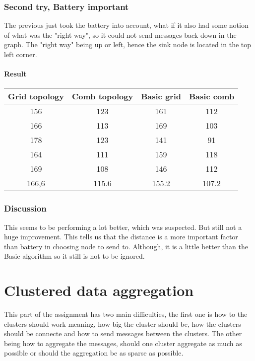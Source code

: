 \documentclass{article}
\begin{document}
\section{Second try, Battery important}
  The previous just took the battery into account, what if it also had
  some notion of what was the "right way", so it could not send messages
  back down in the graph. The "right way" being up or left, hence the sink
  node is located in the top left corner.
  \subsection{Result}
    \begin{tabular}{c|c||c|c}
      Grid topology & Comb topology & Basic grid & Basic comb\\
      \hline
      \hline
      156 & 123 & 161 & 112\\
      166 & 113 & 169 & 103\\
      178 & 123 & 141 & 91 \\
      164 & 111 & 159 & 118\\
      169 & 108 & 146 & 112\\
      \hline
      166,6&115.6&155.2&107.2\\
    \end{tabular}
    \section{Discussion}
     This seems to be performing a lot better, which was suspected. But still not a huge
     improvement. This tells us that the distance is a more important factor than battery
     in choosing node to send to. Although, it is a little better than the Basic algorithm
     so it still is not to be ignored.
     
\part{Clustered data aggregation}
  This part of the assignment has two main difficulties, the first one is 
  how to the clusters should work meaning, how big the cluster should be, how the clusters
  should be connecte and how to send messages between the clusters.
  The other being how to aggregate the messages, should one cluster aggregate as much
  as possible or should the aggregation be as sparse as possible.
\end{document}
